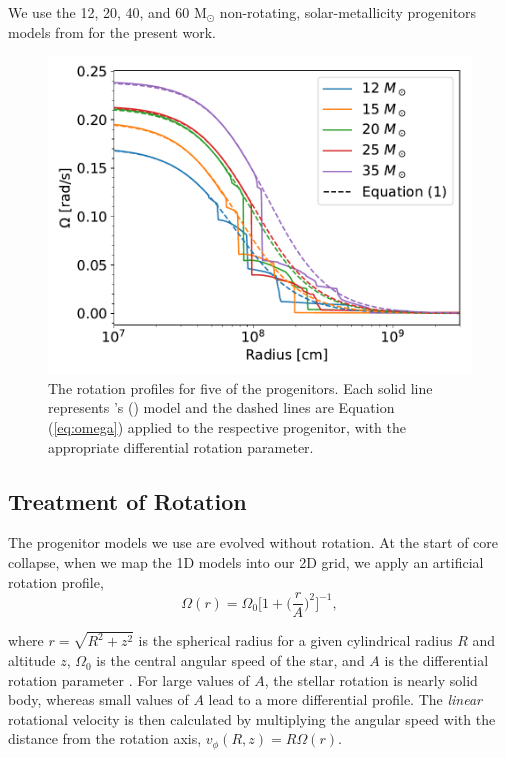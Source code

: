 \documentclass[twocolumn,times]{aastex62}  %
\newcommand{\Msun}{\ensuremath{\mathrm{M}_\odot}\xspace}
\begin{document}
We use the 12, 20, 40, and 60 \Msun non-rotating, solar-metallicity progenitors models from \citet{Suk:2016} for the present work.

\begin{figure}[t]
    \centering
    \includegraphics[scale=0.45]{omega_vs_r.pdf}
    \caption{The rotation profiles for five of the \citet{heger:2005} progenitors.  Each solid line represents \citeauthor{heger:2005}'s (\citeyear{heger:2005}) model and the dashed lines are Equation (\ref{eq:omega}) applied to the respective progenitor, with the appropriate differential rotation parameter.  }
    \label{fig:ovsr}
\end{figure}

\subsection{Treatment of Rotation}




The progenitor models we use are evolved without rotation.
At the start of core collapse, when we map the 1D models into our 2D grid, we apply an artificial rotation profile,
\begin{equation}
    \Omega(r) = \Omega_0 \bigg[1 + \bigg(\frac{r}{A}\bigg)^2 \bigg]^{-1}, 
    \label{eq:omega}
\end{equation}

where $r = \sqrt{R^2 + z^2}$ is the spherical radius for a given cylindrical radius $R$ and altitude $z$, $\Omega_0$ is the central angular speed of the star, and $A$ is the differential rotation parameter \citep{eriguchi:1984}.  For large values of $A$, the stellar rotation is nearly solid body, whereas small values of $A$ lead to a more differential profile. 
The {\it linear} rotational velocity is then calculated by multiplying the angular speed with the distance from the rotation axis, $v_\phi (R, z) = R \Omega (r) $. 
\end{document}
